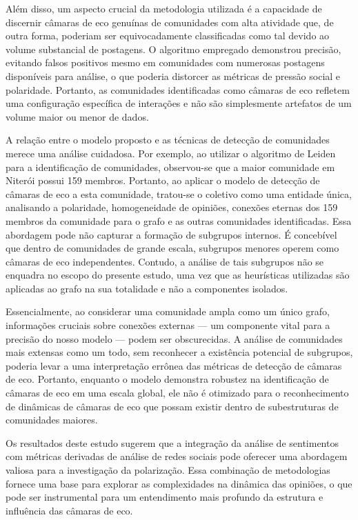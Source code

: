 Além disso, um aspecto crucial da metodologia utilizada é a capacidade de discernir câmaras de eco genuínas de comunidades com alta atividade que, de outra forma, poderiam ser equivocadamente classificadas como tal devido ao volume substancial de postagens. O algoritmo empregado demonstrou precisão, evitando falsos positivos mesmo em comunidades com numerosas postagens disponíveis para análise, o que poderia distorcer as métricas de pressão social e polaridade. Portanto, as comunidades identificadas como câmaras de eco refletem uma configuração específica de interações e não são simplesmente artefatos de um volume maior ou menor de dados.

A relação entre o modelo proposto e as técnicas de detecção de comunidades merece uma análise cuidadosa. Por exemplo, ao utilizar o algoritmo de Leiden para a identificação de comunidades, observou-se que a maior comunidade em Niterói possui 159 membros. Portanto, ao aplicar o modelo de detecção de câmaras de eco a esta comunidade, tratou-se o coletivo como uma entidade única, analisando a polaridade, homogeneidade de opiniões, conexões eternas dos 159 membros da comunidade para o grafo e as outras comunidades identificadas. Essa abordagem pode não capturar a formação de subgrupos internos. É concebível que dentro de comunidades de grande escala, subgrupos menores operem como câmaras de eco independentes. Contudo, a análise de tais subgrupos não se enquadra no escopo do presente estudo, uma vez que as heurísticas utilizadas são aplicadas ao grafo na sua totalidade e não a componentes isolados.

Essencialmente, ao considerar uma comunidade ampla como um único grafo, informações cruciais sobre conexões externas — um componente vital para a precisão do nosso modelo — podem ser obscurecidas. A análise de comunidades mais extensas como um todo, sem reconhecer a existência potencial de subgrupos, poderia levar a uma interpretação errônea das métricas de detecção de câmaras de eco. Portanto, enquanto o modelo demonstra robustez na identificação de câmaras de eco em uma escala global, ele não é otimizado para o reconhecimento de dinâmicas de câmaras de eco que possam existir dentro de subestruturas de comunidades maiores.

Os resultados deste estudo sugerem que a integração da análise de sentimentos com métricas derivadas de análise de redes sociais pode oferecer uma abordagem valiosa para a investigação da polarização. Essa combinação de metodologias fornece uma base para explorar as complexidades na dinâmica das opiniões, o que pode ser instrumental para um entendimento mais profundo da estrutura e influência das câmaras de eco.


